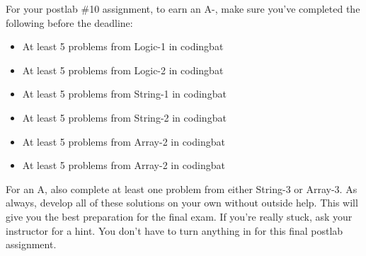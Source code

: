 For your postlab \#10 assignment, to earn an A-, make sure you've completed the following before the deadline:

\begin{itemize}
\item At least 5 problems from Logic-1 in codingbat
\item At least 5 problems from Logic-2 in codingbat
\item At least 5 problems from String-1 in codingbat
\item At least 5 problems from String-2 in codingbat
\item At least 5 problems from Array-2 in codingbat
\item At least 5 problems from Array-2 in codingbat
\end{itemize}

For an A, also complete at least one problem from either String-3 or Array-3. As always, develop all of these solutions on your own without outside help. This will give you the best preparation for the final exam. If you're really stuck, ask your instructor for a hint. You don't have to turn anything in for this final postlab assignment. 

